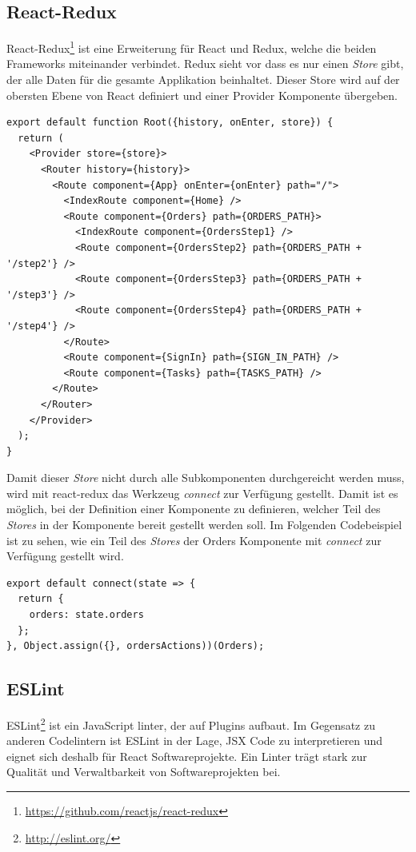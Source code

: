 \subsection{React-Redux}
React-Redux\footnote{\url{https://github.com/reactjs/react-redux}} ist eine Erweiterung für React und Redux, welche die beiden Frameworks miteinander verbindet. Redux sieht vor dass es nur einen \textit{Store} gibt, der alle Daten für die gesamte Applikation beinhaltet. Dieser Store wird auf der obersten Ebene von React definiert und einer Provider Komponente übergeben.

\begin{lstlisting}[caption=Root Komponente]
export default function Root({history, onEnter, store}) {
  return (
    <Provider store={store}>
      <Router history={history}>
        <Route component={App} onEnter={onEnter} path="/">
          <IndexRoute component={Home} />
          <Route component={Orders} path={ORDERS_PATH}>
            <IndexRoute component={OrdersStep1} />
            <Route component={OrdersStep2} path={ORDERS_PATH + '/step2'} />
            <Route component={OrdersStep3} path={ORDERS_PATH + '/step3'} />
            <Route component={OrdersStep4} path={ORDERS_PATH + '/step4'} />
          </Route>
          <Route component={SignIn} path={SIGN_IN_PATH} />
          <Route component={Tasks} path={TASKS_PATH} />
        </Route>
      </Router>
    </Provider>
  );
}
\end{lstlisting}

Damit dieser \textit{Store} nicht durch alle Subkomponenten durchgereicht werden muss, wird mit react-redux das Werkzeug \textit{connect} zur Verfügung gestellt. Damit ist es möglich, bei der Definition einer Komponente zu definieren, welcher Teil des \textit{Stores} in der Komponente bereit gestellt werden soll. Im Folgenden Codebeispiel ist zu sehen, wie ein Teil des \textit{Stores} der Orders Komponente mit \textit{connect} zur Verfügung gestellt wird.
\begin{lstlisting}[caption=connect im Einsatz]
export default connect(state => {
  return {
    orders: state.orders
  };
}, Object.assign({}, ordersActions))(Orders);
\end{lstlisting}

\subsection{ESLint}
ESLint\footnote{\url{http://eslint.org/}} ist ein JavaScript linter, der auf Plugins aufbaut. Im Gegensatz zu anderen Codelintern ist ESLint in der Lage, JSX Code zu interpretieren und eignet sich deshalb für React Softwareprojekte. Ein Linter trägt stark zur Qualität und Verwaltbarkeit von Softwareprojekten bei.

